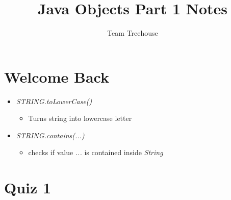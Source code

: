 \documentclass[12pt]{article}
\begin{document}
\title{Java Objects Part 1 Notes}
\author{Team Treehouse}
\maketitle

\bigskip

\section{Welcome Back}

\bigskip

\begin{itemize}
    \item \textit{STRING.toLowerCase()}
    \begin{itemize}
        \item Turns string into lowercase letter
    \end{itemize}
    \item \textit{STRING.contains(...)}
    \begin{itemize}
        \item checks if value \textit{...} is contained inside \textit{String}
    \end{itemize}
\end{itemize}

\bigskip

\section{Quiz 1}

\bigskip
\end{document}
